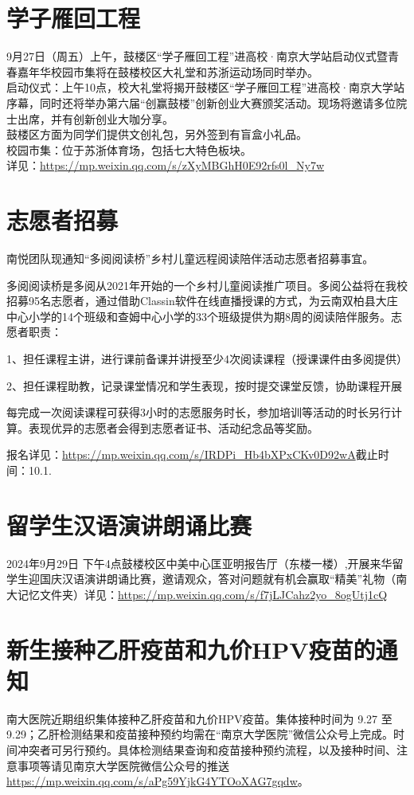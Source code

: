 \documentclass[letterpaper, 12pt]{article}
\begin{document}
\begin{multicols}{2}
\section{学子雁回工程}
9月27日（周五）上午，鼓楼区“学子雁回工程”进高校·南京大学站启动仪式暨青春嘉年华校园市集将在鼓楼校区大礼堂和苏浙运动场同时举办。\\
启动仪式：上午10点，校大礼堂将揭开鼓楼区“学子雁回工程”进高校·南京大学站序幕，同时还将举办第六届“创赢鼓楼”创新创业大赛颁奖活动。现场将邀请多位院士出席，并有创新创业大咖分享。\\
鼓楼区方面为同学们提供文创礼包，另外签到有盲盒小礼品。\\
校园市集：位于苏浙体育场，包括七大特色板块。\\
详见：\url{https://mp.weixin.qq.com/s/zXyMBGhH0E92rfs0l_Ny7w}
\section{志愿者招募}
南悦团队现通知“多阅阅读桥”乡村儿童远程阅读陪伴活动志愿者招募事宜。

多阅阅读桥是多阅从2021年开始的一个乡村儿童阅读推广项目。多阅公益将在我校招募95名志愿者，通过借助Classin软件在线直播授课的方式，为云南双柏县大庄中心小学的14个班级和查姆中心小学的33个班级提供为期8周的阅读陪伴服务。志愿者职责：

1、担任课程主讲，进行课前备课并讲授至少4次阅读课程（授课课件由多阅提供）

2、担任课程助教，记录课堂情况和学生表现，按时提交课堂反馈，协助课程开展

每完成一次阅读课程可获得3小时的志愿服务时长，参加培训等活动的时长另行计算。表现优异的志愿者会得到志愿者证书、活动纪念品等奖励。

报名详见：\url{https://mp.weixin.qq.com/s/IRDPi_Hb4bXPxCKv0D92wA}截止时间：10.1.
\section{留学生汉语演讲朗诵比赛}
2024年9月29日 下午4点鼓楼校区中美中心匡亚明报告厅（东楼一楼）,开展来华留学生迎国庆汉语演讲朗诵比赛，邀请观众，答对问题就有机会赢取“精美”礼物（南大记忆文件夹）详见：\url{https://mp.weixin.qq.com/s/f7jLJCahz2yo_8ogUtj1cQ}
\section{新生接种乙肝疫苗和九价HPV疫苗的通知}
南大医院近期组织集体接种乙肝疫苗和九价HPV疫苗。集体接种时间为 9.27 至 9.29；乙肝检测结果和疫苗接种预约均需在“南京大学医院”微信公众号上完成。时间冲突者可另行预约。具体检测结果查询和疫苗接种预约流程，以及接种时间、注意事项等请见南京大学医院微信公众号的推送\url{https://mp.weixin.qq.com/s/aPg59YjkG4YTOoXAG7gqdw}。

\end{multicols}
\end{document}
